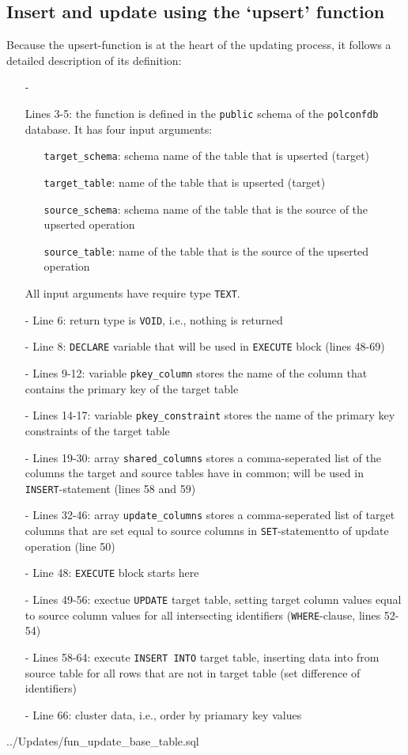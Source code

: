 \subsection{Insert and update using the `upsert' function}\label{subsec_upsert_data_function}





Because the upsert-function is at the heart of the updating process, it follows a detailed description of its definition:

\begin{itemize}
\item[-]{Lines 3-5: 
the function is defined in the \texttt{public} schema of the \texttt{polconfdb} database.
It has four input arguments:
  \begin{itemize}
  \item[]{\texttt{target\_schema}: schema name of the table that is upserted (target)}
  \item[]{\texttt{target\_table}: name of the table that is upserted (target)}
  \item[]{\texttt{source\_schema}: schema name of the table that is the source of the upserted operation}
  \item[]{\texttt{source\_table}: name of the table that is the source of the upserted operation}
  \end{itemize}
All input arguments have require type \texttt{TEXT}.
}
\item[-]{Line 6: return type is \texttt{VOID}, i.e., nothing is returned}
\item[-]{Line 8: \texttt{DECLARE} variable that will be used in \texttt{EXECUTE} block (lines 48-69)}
\item[-]{Lines 9-12: variable \texttt{pkey\_column} stores the name of the column that contains the primary key of the target table}
\item[-]{Lines 14-17: variable \texttt{pkey\_constraint} stores the name of the primary key constraints of the target table}
\item[-]{Lines 19-30: array \texttt{shared\_columns} stores a comma-seperated list of the columns the target and source tables have in common; will be used in \texttt{INSERT}-statement (lines 58 and 59)}
\item[-]{Lines 32-46: array \texttt{update\_columns} stores a comma-seperated list of target columns that are set equal to source columns in \texttt{SET}-statementto of update operation (line 50)}
\item[-]{Line 48: \texttt{EXECUTE} block starts here}
\item[-]{Lines 49-56: exectue \texttt{UPDATE} target table, setting target column values equal to source column values for all intersecting identifiers (\texttt{WHERE}-clause, lines 52-54)}
\item[-]{Lines 58-64: execute \texttt{INSERT INTO} target table, inserting data into from source table for all rows that are not in target table (set difference of identifiers)}
\item[-]{Line 66: cluster data, i.e., order by priamary key values}
\end{itemize}

%
{../Updates/fun_update_base_table.sql}